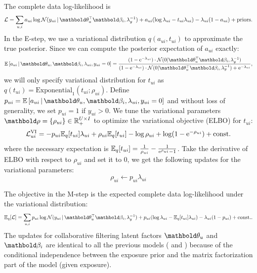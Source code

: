  The complete data log-likelihood is
\begin{equation*}
\mathcal{L} = \sum_{u, i} a_{ui}\log \cN(y_{ui} \g \mb\theta_u^\top\mb\beta_i, \lambda_y^{-1}) + a_{ui} (\log \lambda_{ui} - t_{ui} \lambda_{ui}) - \lambda_{ui}(1 - a_{ui}) + \mathrm{priors}.
\end{equation*}
In the E-step, we use a variational distribution $q(a_{ui}, t_{ui})$ to approximate the true posterior. Since we can compute the posterior expectation of $a_{ui}$ exactly:
\begin{equation}
\E{a_{ui} \g \mb\theta_u, \mb\beta_i, \lambda_{ui}, y_{ui} = 0} = \frac{(1 - \me^{-\lambda_{ui}}) \cdot \cN(0 | \mb\theta_u^\top\mb\beta_i, \lambda_y^{-1})}{(1 - \me^{-\lambda_{ui}})\cdot \cN(0 |  \mb\theta_u^\top \mb\beta_i, \lambda_y^{-1}) + \me^{-\lambda_{ui}}},
\label{chpt:expomf:eq:social_a}
\end{equation}
we will only specify variational distribution for $t_{ui}$ as $q(t_{ui}) = \mathrm{Exponential}_1(t_{ui}; \rho_{ui})$. Define $p_{ui} = \E{a_{ui} \g \mb\theta_u, \mb\beta_i, \lambda_{ui}, y_{ui} = 0}$ and without loss of generality, we set $p_{ui} = 1$ if $y_{ui} > 0$. We tune the variational parameters $\mb\rho = \{\rho_{ui}\} \in \RR_+^{U\times I}$ to optimize the variational objective (\gls{ELBO}) for $t_{ui}$:
\[
\mathcal{L}^\textrm{VI}_{ui} = -p_{ui}\mathbb{E}_q[t_{ui}] \lambda_{ui} + \rho_{ui} \mathbb{E}_q[t_{ui}] - \log\rho_{ui} + \log(1 - \mathrm{e}^{-\rho_{ui}}) + \mathrm{const.}
\]
where the necessary expectation is $\mathbb{E}_q[t_{ui}] = \frac{1}{\rho_{ui}} - \frac{1}{\mathrm{e}^{\rho_{ui}} - 1}$. Take the derivative of \gls{ELBO} with respect to $\rho_{ui}$ and set it to $0$, we get the following updates for the variational parameters:
\begin{equation}
\rho_{ui} \leftarrow p_{ui}\lambda_{ui}
\label{chpt:expomf:eq:social_rho}
\end{equation}

  The objective in the M-step is the expected complete data log-likelihood under the variational distribution:
\begin{equation*}
\mathbb{E}_q[\mathcal{L}] = \sum_{u, i} p_{ui} \log \cN(y_{ui} \g \mb\theta_u^\top\mb\beta_i, \lambda_y^{-1}) + p_{ui} (\log\lambda_{ui}- \mathbb{E}_q[t_{ui}] \lambda_{ui}) - \lambda_{ui}(1 - p_{ui}) + \const.
\end{equation*}
The updates for collaborative filtering latent factors $\mb\theta_u$ and $\mb\beta_i$ are identical to all the previous models ( and ) because of the conditional independence between the exposure prior and the matrix factorization part of the model (given exposure). 

